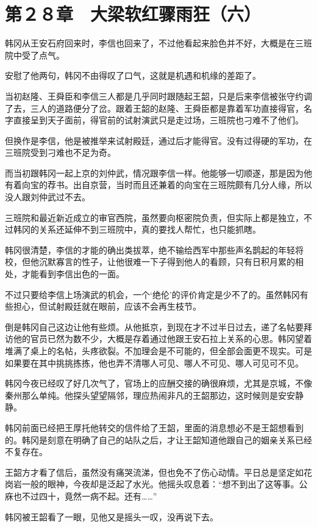 \section{第２８章　大梁软红骤雨狂（六）}

韩冈从王安石府回来时，李信也回来了，不过他看起来脸色并不好，大概是在三班院中受了点气。

安慰了他两句，韩冈不由得叹了口气，这就是机遇和机缘的差距了。

当初赵隆、王舜臣和李信三人都是几乎同时跟随起王韶，只是后来李信被张守约调了去，三人的道路便分了岔。跟着王韶的赵隆、王舜臣都是靠着军功直接得官，名字直接呈到天子面前，得官前的试射演武只是走过场，三班院也刁难不了他们。

但换作是李信，他是被推举来试射殿廷，通过后才能得官。没有过得硬的军功，在三班院受到刁难也不足为奇。

而当初跟韩冈一起上京的刘仲武，情况跟李信一样。他能够一切顺遂，那是因为他有着向宝的荐书。出自京营，当时而且还兼着的向宝在三班院颇有几分人缘，所以没人跟刘仲武过不去。

三班院和最近新近成立的审官西院，虽然要向枢密院负责，但实际上都是独立，不过韩冈的关系还延伸不到三班院中，真的要找人帮忙，也只能抓瞎。

韩冈很清楚，李信的才能的确出类拔萃，绝不输给西军中那些声名鹊起的年轻将校，但他沉默寡言的性子，让他很难一下子得到他人的看顾，只有日积月累的相处，才能看到李信出色的一面。

不过只要给李信上场演武的机会，一个‘绝伦’的评价肯定是少不了的。虽然韩冈有些担心，但试射殿廷就在眼前，应该不会再生枝节。

倒是韩冈自己这边让他有些烦。从他抵京，到现在才不过半日过去，递了名帖要拜访他的官员已然为数不少，大概是存着通过他跟王安石拉上关系的心思。韩冈望着堆满了桌上的名帖，头疼欲裂。不加理会是不可能的，但全部会面更不现实。可是如果要在其中挑挑拣拣，他也弄不清哪人可见、哪人不可见、哪人可见可不见。

韩冈今夜已经叹了好几次气了，官场上的应酬交接的确很麻烦，尤其是京城，不像秦州那么单纯。他探头望望隔邻，理应热闹非凡的王韶那边，这时候则是安安静静。

韩冈前面已经把王厚托他转交的信件给了王韶，里面的消息想必不是王韶想看到的。韩冈是刻意在明确了自己的站队之后，才让王韶知道他跟自己的姻亲关系已经不复存在。

王韶方才看了信后，虽然没有痛哭流涕，但也免不了伤心动情。平日总是坚定如花岗岩一般的眼神，今夜却是泛起了水光。他摇头叹息着：“想不到出了这等事。公庥也不过四十，竟然一病不起。还有……”

韩冈被王韶看了一眼，见他又是摇头一叹，没再说下去。

